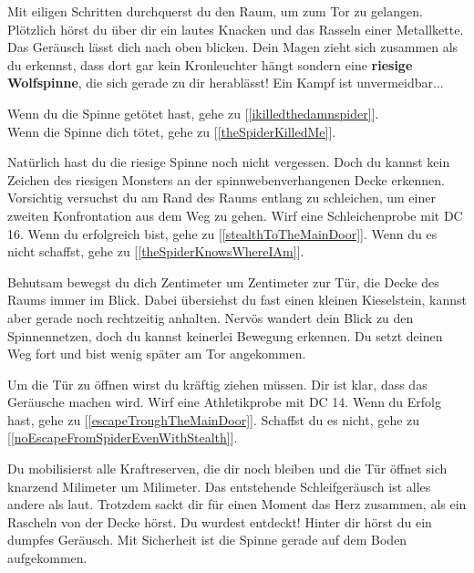 
Mit eiligen Schritten durchquerst du den Raum, um zum Tor zu gelangen. Plötzlich hörst du über dir ein lautes Knacken und das Rasseln einer Metallkette.
Das Geräusch lässt dich nach oben blicken. Dein Magen zieht sich zusammen als du erkennst, dass dort gar kein Kronleuchter hängt sondern eine \textbf{riesige Wolfspinne}, die sich gerade zu dir herablässt! Ein Kampf ist unvermeidbar...


Wenn du die Spinne getötet hast, gehe zu [\ref{ikilledthedamnspider}].
\\Wenn die Spinne dich tötet, gehe zu [\ref{theSpiderKilledMe}].


Natürlich hast du die riesige Spinne noch nicht vergessen. Doch du kannst kein Zeichen des riesigen Monsters an der spinnwebenverhangenen Decke erkennen. Vorsichtig versuchst du am Rand des Raums entlang zu schleichen, um einer zweiten Konfrontation aus dem Weg zu gehen. Wirf eine Schleichenprobe mit DC 16. Wenn du erfolgreich bist, gehe zu [\ref{stealthToTheMainDoor}].
Wenn du es nicht schaffst, gehe zu [\ref{theSpiderKnowsWhereIAm}].


Behutsam bewegst du dich Zentimeter um Zentimeter zur Tür, die Decke des Raums immer im Blick. Dabei übersiehst du fast einen kleinen Kieselstein, kannst aber gerade noch rechtzeitig anhalten. Nervös wandert dein Blick zu den Spinnennetzen, doch du kannst keinerlei Bewegung erkennen.
Du setzt deinen Weg fort und bist wenig später am Tor angekommen.

Um die Tür zu öffnen wirst du kräftig ziehen müssen. Dir ist klar, dass das Geräusche machen wird. Wirf eine Athletikprobe mit DC 14. Wenn du Erfolg hast, gehe zu [\ref{escapeTroughTheMainDoor}]. Schaffst du es nicht, gehe zu [\ref{noEscapeFromSpiderEvenWithStealth}].


Du mobilisierst alle Kraftreserven, die dir noch bleiben und die Tür öffnet sich knarzend Milimeter um Milimeter. Das entstehende Schleifgeräusch ist alles andere als laut. Trotzdem sackt dir für einen Moment das Herz zusammen, als ein Rascheln von der Decke hörst. Du wurdest entdeckt! Hinter dir hörst du ein dumpfes Geräusch. Mit Sicherheit ist die Spinne gerade auf dem Boden aufgekommen.

